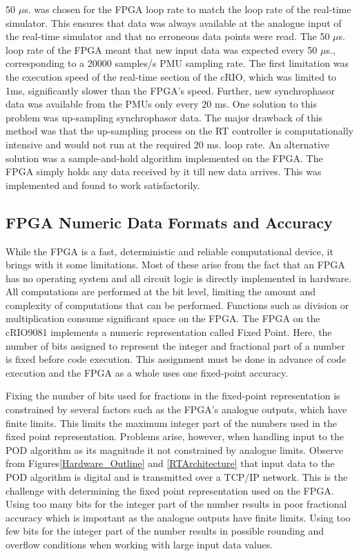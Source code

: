 \documentclass{ieeeaccess}
\begin{document}
50 $\mu$s. was chosen for the FPGA loop rate to match the loop rate of the real-time simulator. This ensures that data was always available at the analogue input of the real-time simulator and that no erroneous data points were read. The 50 $\mu$s. loop rate of the FPGA meant that new input data was expected every 50 $\mu$s., corresponding to a 20000 samples/s PMU sampling rate. The first limitation was the execution speed of the real-time section of the cRIO, which was limited to 1ms, significantly slower than the FPGA\rq{s} speed. Further, new synchrophasor data was available from the PMUs only every 20 ms. One solution to this problem was up-sampling synchrophasor data. The major drawback of this method was that the up-sampling process on the RT controller is computationally intensive and would not run at the required 20 ms. loop rate. An alternative solution was a sample-and-hold algorithm implemented on the FPGA. The FPGA simply holds any data received by it till new data arrives. This was implemented and found to work satisfactorily.

\subsection{FPGA Numeric Data Formats and Accuracy}

While the FPGA is a fast, deterministic and reliable computational device, it brings with it some limitations. Most of these arise from the fact that an FPGA has no operating system and all circuit logic is directly implemented in hardware. All computations are performed at the bit level, limiting the amount and complexity of computations that can be performed. Functions such as division or multiplication consume significant space on the FPGA\cite{LabViewManuals}. The FPGA on the cRIO9081 implements a numeric representation called Fixed Point\cite{LabViewManuals}. Here, the number of bits assigned to represent the integer and fractional part of a number is fixed before code execution\cite{LabViewManuals}. This assignment must be done in advance of code execution and the FPGA as a whole uses one fixed-point accuracy.

Fixing the number of bits used for fractions in the fixed-point representation is constrained by several factors such as the FPGA\rq{s} analogue outputs, which have finite limits. This limits the maximum integer part of the numbers used in the fixed point representation. Problems arise, however, when handling input to the POD algorithm as its magnitude it not constrained by analogue limits. Observe from Figures\ref{Hardware_Outline} and \ref{RTArchitecture} that input data to the POD algorithm is digital and is transmitted over a TCP/IP network. This is the challenge with determining the fixed point representation used on the FPGA. Using too many bits for the integer part of the number results in poor fractional accuracy which is important as the analogue outputs have finite limits. Using too few bits for the integer part of the number results in possible rounding and overflow conditions when working with large input data values.
\end{document}

